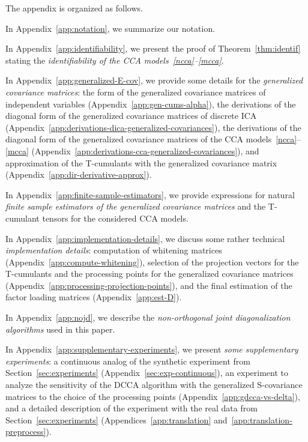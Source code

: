 \documentclass{article}
\newenvironment{mi}{%
  \begin{list}{-}{}
  \let\olditem\item
}{%
  \end{list}
}
\begin{document}
The appendix is organized as follows. 
\begin{mi}
\item
In Appendix~\ref{app:notation}, we summarize our notation.
\item
In Appendix~\ref{app:identifiability}, we present the proof of Theorem~\ref{thm:identif} stating the \emph{identifiability of the CCA models~\eqref{ncca}--\eqref{mcca}}.
\item
In Appendix~\ref{app:generalized-E-cov}, we provide some details for the \emph{generalized covariance matrices}: the form of the generalized covariance matrices of independent variables (Appendix~\ref{app:gen-cums-alpha}), the derivations of the diagonal form of the generalized covariance matrices of discrete ICA (Appendix~\ref{app:derivations-dica-generalized-covariances}), the derivations of the diagonal form of the generalized covariance matrices of the CCA models~\eqref{ncca}--\eqref{mcca} (Appendix~\ref{app:derivations-cca-generalized-covariances}), and approximation of the T-cumulants with the generalized covariance matrix (Appendix~\ref{app:dir-derivative-approx}).
\item
In Appendix~\ref{app:finite-sample-estimators}, we provide expressions for natural \emph{finite sample estimators of the generalized covariance matrices} and the T-cumulant tensors for the considered CCA models.
\item
In Appendix~\ref{app:implementation-details}, we discuss some rather technical \emph{implementation details}: computation of whitening matrices (Appendix~\ref{app:compute-whitening}), 
selection of the projection vectors for the T-cumulants and the processing points for the generalized covariance matrices (Appendix~\ref{app:processing-projection-points}), and the final estimation of the factor loading matrices (Appendix~\ref{app:est-D}).
\item
In Appendix~\ref{app:nojd}, we describe the \emph{non-orthogonal joint diagonalization algorithms} used in this paper.
\item In Appendix~\ref{app:supplementary-experiments}, we present \emph{some supplementary experiments}: a continuous analog of the synthetic experiment from Section~\ref{sec:experiments} (Appendix~\ref{sec:exp-continuous}), an experiment to analyze the sensitivity of the DCCA algorithm with the generalized S-covariance matrices to the choice of the processing points (Appendix~\ref{app:gdcca-vs-delta}), and a detailed description of the experiment with the real data from Section~\ref{sec:experiments} (Appendices~\ref{app:translation} and~\ref{app:translation-preprocess}).
\end{mi}
\end{document}
